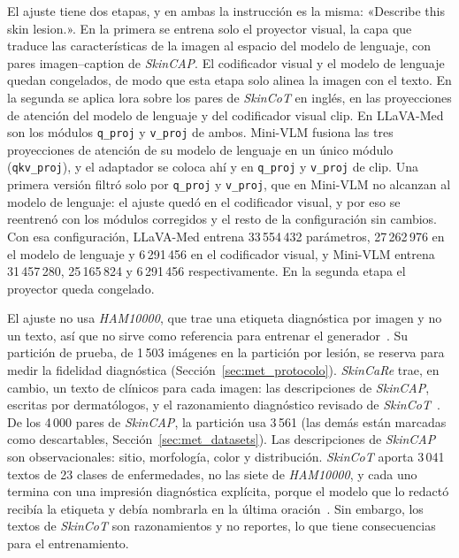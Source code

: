 El ajuste tiene dos etapas, y en ambas la instrucción es la misma: «Describe this skin lesion.». En la primera se entrena
solo el proyector visual, la capa que traduce las características de la imagen al espacio del modelo de lenguaje, con
pares imagen--caption de \emph{SkinCAP}. El codificador visual y el modelo de lenguaje quedan congelados, de modo que
esta etapa solo alinea la imagen con el texto. En la segunda se aplica \gls{lora} sobre los pares de \emph{SkinCoT} en
inglés, en las proyecciones de atención del modelo de lenguaje y del codificador visual \gls{clip}. En LLaVA-Med son
los módulos \texttt{q\_proj} y \texttt{v\_proj} de ambos. Mini-VLM fusiona las tres proyecciones de atención de su
modelo de lenguaje en un único módulo (\texttt{qkv\_proj}), y el adaptador se coloca ahí y en \texttt{q\_proj} y
\texttt{v\_proj} de \gls{clip}. Una primera versión filtró solo por \texttt{q\_proj} y \texttt{v\_proj}, que en
Mini-VLM no alcanzan al modelo de lenguaje: el ajuste quedó en el codificador visual, y por eso se reentrenó con los
módulos corregidos y el resto de la configuración sin cambios.
Con esa configuración, LLaVA-Med entrena 33\,554\,432 parámetros, 27\,262\,976 en el modelo de lenguaje y 6\,291\,456
en el codificador visual, y Mini-VLM entrena 31\,457\,280, 25\,165\,824 y 6\,291\,456 respectivamente. En la segunda
etapa el proyector queda congelado.

El ajuste no usa \emph{HAM10000}, que trae una etiqueta diagnóstica por imagen y no un texto, así que no sirve como
referencia para entrenar el generador~\cite{tschandl2018ham10000}. Su partición de prueba, de 1\,503 imágenes en la partición por lesión, se reserva
para medir la fidelidad diagnóstica (Sección~\ref{sec:met_protocolo}). \emph{SkinCaRe} trae, en cambio, un texto de
clínicos para cada imagen: las descripciones de \emph{SkinCAP}, escritas por dermatólogos, y el razonamiento diagnóstico
revisado de \emph{SkinCoT}~\cite{shen2025skincare}. De los 4\,000 pares de \emph{SkinCAP}, la partición usa 3\,561 (las demás están marcadas como descartables,
Sección~\ref{sec:met_datasets}). Las descripciones de \emph{SkinCAP} son observacionales: sitio, morfología, color y
distribución. \emph{SkinCoT} aporta 3\,041 textos de 23 clases de enfermedades, no las siete de \emph{HAM10000}, y cada
uno termina con una impresión diagnóstica explícita, porque el modelo que lo redactó recibía la etiqueta y debía
nombrarla en la última oración~\cite{shen2025skincare}. Sin embargo, los textos de \emph{SkinCoT} son razonamientos y no reportes, lo que tiene consecuencias para el
entrenamiento.

